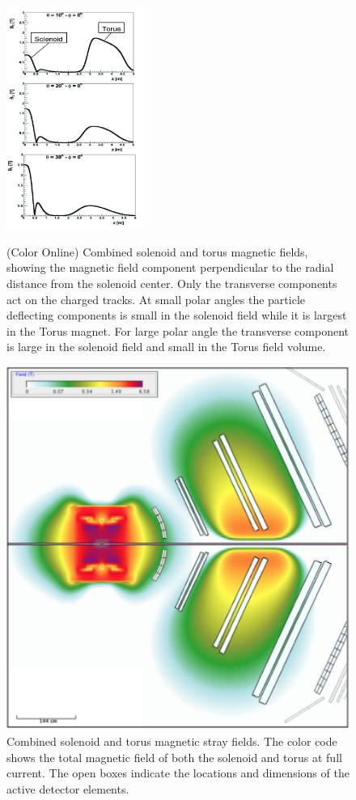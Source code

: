 \documentclass[final,3p,twocolumn]{elsarticle}
\begin{document}
\begin{figure}[htbp!]
\centerline{\includegraphics[width=0.4\textwidth,height=0.40\textheight]{magfield.png}}
\caption{(Color Online) Combined solenoid and torus magnetic fields, showing the magnetic field component perpendicular 
to the radial distance from the solenoid center. Only
  the transverse components act on the charged tracks. At small polar angles the particle deflecting components is small
  in the solenoid field while it is largest in the Torus magnet. For large polar angle the transverse component is large in 
  the solenoid field and small in the Torus field volume. } 
\label{solenoid-torus}
\vspace{0.5cm}
\centerline{\includegraphics[width=0.95\columnwidth]{magfield-2.png}}
\caption{Combined solenoid and torus magnetic stray fields. The color code shows the total magnetic field of both
  the solenoid and torus at full current. The open boxes indicate the locations and dimensions of the active detector
  elements.}
\label{stray-field}
\end{figure}
\end{document}
